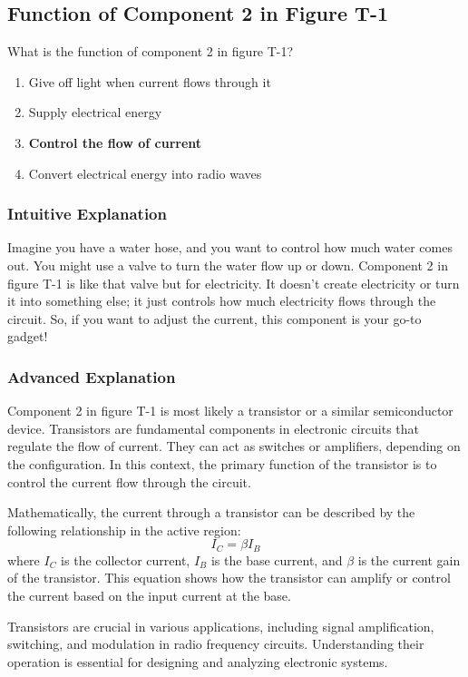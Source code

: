 \subsection{Function of Component 2 in Figure T-1}
\label{T6D10}

\begin{tcolorbox}[colback=gray!10!white,colframe=black!75!black,title=T6D10]
What is the function of component 2 in figure T-1?
\begin{enumerate}[label=\Alph*)]
    \item Give off light when current flows through it
    \item Supply electrical energy
    \item \textbf{Control the flow of current}
    \item Convert electrical energy into radio waves
\end{enumerate}
\end{tcolorbox}

\subsubsection{Intuitive Explanation}
Imagine you have a water hose, and you want to control how much water comes out. You might use a valve to turn the water flow up or down. Component 2 in figure T-1 is like that valve but for electricity. It doesn’t create electricity or turn it into something else; it just controls how much electricity flows through the circuit. So, if you want to adjust the current, this component is your go-to gadget!

\subsubsection{Advanced Explanation}
Component 2 in figure T-1 is most likely a transistor or a similar semiconductor device. Transistors are fundamental components in electronic circuits that regulate the flow of current. They can act as switches or amplifiers, depending on the configuration. In this context, the primary function of the transistor is to control the current flow through the circuit. 

Mathematically, the current through a transistor can be described by the following relationship in the active region:
\[
I_C = \beta I_B
\]
where \( I_C \) is the collector current, \( I_B \) is the base current, and \( \beta \) is the current gain of the transistor. This equation shows how the transistor can amplify or control the current based on the input current at the base.

Transistors are crucial in various applications, including signal amplification, switching, and modulation in radio frequency circuits. Understanding their operation is essential for designing and analyzing electronic systems.

